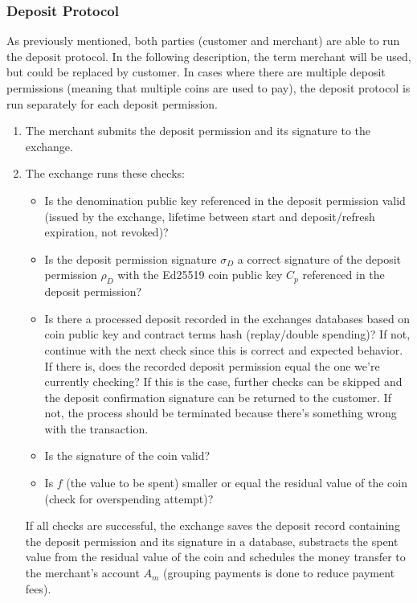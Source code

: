 \subsubsection{Deposit Protocol}
\label{sec:deposit-protocol}
As previously mentioned, both parties (customer and merchant) are able to run the deposit protocol.
In the following description, the term merchant will be used, but could be replaced by customer.
In cases where there are multiple deposit permissions (meaning that multiple coins are used to pay), the deposit protocol is run separately for each deposit permission.
\begin{enumerate}
    \item The merchant submits the deposit permission and its signature to the exchange.
    \item The exchange runs these checks:
          \begin{itemize}
              \item Is the denomination public key referenced in the deposit permission valid (issued by the exchange, lifetime between start and deposit/refresh expiration, not revoked)?
              \item Is the deposit permission signature $ \sigma_{D} $ a correct signature of the deposit permission $ \rho_{D} $ with the Ed25519 coin public key $ C_p $ referenced in the deposit permission?
              \item Is there a processed deposit recorded in the exchanges databases based on coin public key and contract terms hash (replay/double spending)?
                    If not, continue with the next check since this is correct and expected behavior.
                    \\If there is, does the recorded deposit permission equal the one we're currently checking?
                    If this is the case, further checks can be skipped and the deposit confirmation signature can be returned to the customer.
                    If not, the process should be terminated because there's something wrong with the transaction.
              \item Is the signature of the coin valid?
              \item Is $ f $ (the value to be spent) smaller or equal the residual value of the coin (check for overspending attempt)?
          \end{itemize}
          If all checks are successful, the exchange saves the deposit record containing the deposit permission and its signature in a database, substracts the spent value from the residual value of the coin and schedules the money transfer to the merchant's account $ A_m $ (grouping payments is done to reduce payment fees).

\end{enumerate}
